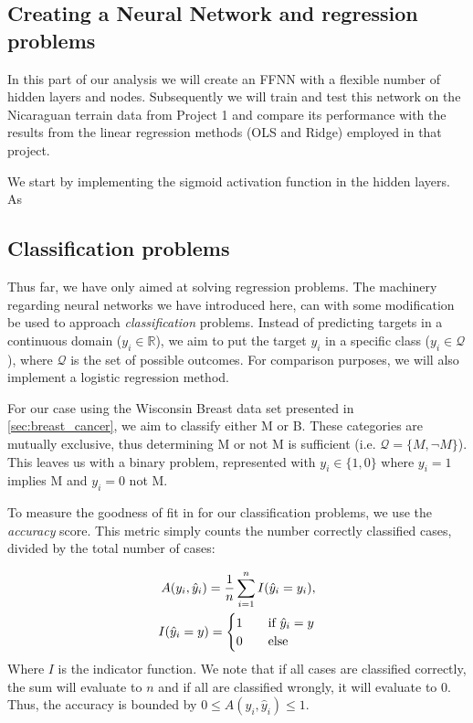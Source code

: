 
\subsection{Creating a Neural Network and regression problems}
    In this part of our analysis we will create an FFNN with a flexible number of hidden layers and nodes. Subsequently we will train and test this network on the Nicaraguan terrain data from Project 1 and compare its performance with the results from the linear regression methods (OLS and Ridge) employed in that project. 


    We start by implementing the sigmoid activation function in the hidden layers. As 

\subsection{Classification problems}
    Thus far, we have only aimed at solving regression problems. The machinery regarding neural networks we have introduced here, can with some modification be used to approach \textit{classification} problems. Instead of predicting targets in a continuous domain ($y_i \in \mathbb{R}$), we aim to put the target $y_i$ in a specific class ($y_i \in \mathcal{Q}$), where $\mathcal{Q}$ is the set of possible outcomes. For comparison purposes, we will also implement a logistic regression method.

    For our case using the Wisconsin Breast data set presented in \cref{sec:breast_cancer}, we aim to classify either M or B. These categories are mutually exclusive, thus determining M or not M is sufficient (i.e. $\mathcal{Q} = \{ M, \neg M \}$). This leaves us with a binary problem, represented with $y_i \in \{ 1, 0 \}$ where $y_i = 1$ implies M and $y_i = 0$ not M.

    To measure the goodness of fit in for our classification problems, we use the \textit{accuracy} score. This metric simply counts the number correctly classified cases, divided by the total number of cases:

    \begin{align}
        A(y_i, \hat{y}_i) = \frac{1}{n}\sum_{i=1}^{n} I(\hat{y}_i = y_i), \\
        I(\hat{y}_i = y) = \begin{cases}
            1\hspace{10px}&\text{if }\hat{y}_i = y \\
            0\hspace{10px}&\text{else}
        \end{cases} \nonumber
    \end{align}
    Where $I$ is the indicator function. We note that if all cases are classified correctly, the sum will evaluate to $n$ and if all are classified wrongly, it will evaluate to 0. Thus, the accuracy is bounded by $0 \leq A(y_i, \hat{y}_i) \leq 1$.

